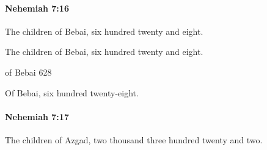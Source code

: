 		\paragraph{Nehemiah 7:16} %
			\label{NEHEMIAH-7-16}

			The children of Bebai, six hundred twenty and eight.

			\begin{versebox}
					\item[BHS] 
					\item[LXX] 
					\item[ASV] The children of Bebai, six hundred twenty and eight.
					\item[NIV] of Bebai 628
					\item[NRSV] Of Bebai, six hundred twenty-eight.
			\end{versebox}

		\paragraph{Nehemiah 7:17} %
			\label{NEHEMIAH-7-17}

			The children of Azgad, two thousand three hundred twenty and two.


